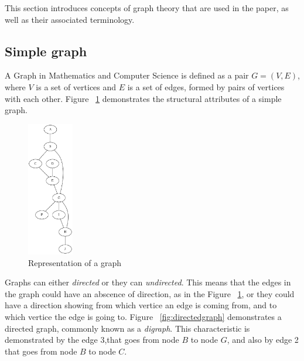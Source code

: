 \label{Graph Overview}


This section introduces concepts of graph theory that are used in the paper, as well as their associated terminology.

\subsection{Simple graph}
A Graph in Mathematics and Computer Science is defined as a pair $G = (V, E)$,  where $V$ is a set of vertices and $E$ is a set of edges, formed by 
pairs of vertices with each other. Figure ~\ref{fig:simplegraph} demonstrates the structural attributes of a simple graph.

\begin{figure}[H]
  \begin{center}
      \includegraphics[width=0.18\textwidth]{simplegraph.png}
  \end{center}    
  \caption{Representation of a graph}
  \label{fig:simplegraph}
\end{figure} 
Graphs can either \textit{directed} or they can \textit{undirected}. This means that the edges in the graph could have an abscence of direction, as in the Figure 
~\ref{fig:simplegraph}, or they could have a direction showing from which vertice an edge is coming from, and to which vertice the edge is going to. Figure ~\ref{fig:directedgraph} 
demonstrates a directed graph, commonly known as a \textit{digraph}. This characteristic is demonstrated by the edge $3$,that goes from node $B$ to node $G$, and also by 
edge 2 that goes from node $B$ to node $C$.

